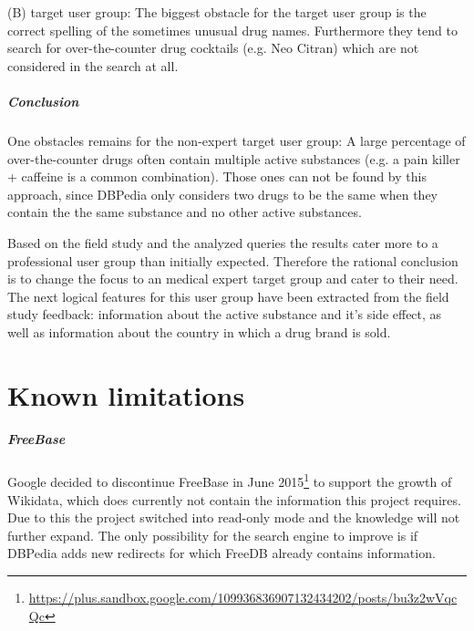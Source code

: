 \documentclass[11pt,titlepage,oneside,openany]{book}
\begin{document}
(B) target user group: The biggest obstacle for the target user group is the correct spelling of the sometimes unusual drug names. Furthermore they tend to search for over-the-counter drug cocktails (e.g. Neo Citran) which are not considered in the search at all.

\paragraph{Conclusion}
\label{conclusion}

One obstacles remains for the non-expert target user group: 
A large percentage of over-the-counter drugs often contain multiple active substances (e.g. a pain killer + caffeine is a common combination). Those ones can not be found by this approach, since DBPedia only considers two drugs to be the same when they contain the the same substance and no other active substances.

Based on the field study and the analyzed queries the results cater more to a professional user group than initially expected. Therefore the rational conclusion is to change the focus to an medical expert target group and cater to their need. The next logical features for this user group have been extracted from the field study feedback: information about the active substance and it's side effect, as well as information about the country in which a drug brand is sold.



\label{ex:ecotrin}


\chapter{Known limitations}
\label{cha:limiations}



\paragraph{FreeBase}
\label{prob:freebase}
Google decided to discontinue FreeBase in June 2015\footnote{\url{https://plus.sandbox.google.com/109936836907132434202/posts/bu3z2wVqcQc}} to support the growth of Wikidata, which does currently not contain the information this project requires. Due to this the project switched into read-only mode and the knowledge will not further expand. The only possibility for the search engine to improve is if DBPedia adds new redirects for which FreeDB already contains information. 
\end{document}
